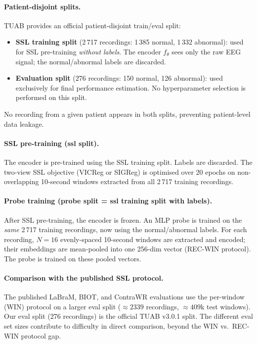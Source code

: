 \documentclass[11pt,a4paper]{article}
\begin{document}
\paragraph{Patient-disjoint splits.}
TUAB provides an official patient-disjoint train/eval split:
\begin{itemize}[noitemsep]
  \item \textbf{SSL training split} (2\,717 recordings: 1\,385 normal, 1\,332 abnormal):
    used for SSL pre-training \emph{without labels}.  The encoder $f_\theta$ sees only
    the raw EEG signal; the normal/abnormal labels are discarded.
  \item \textbf{Evaluation split} (276 recordings: 150 normal, 126 abnormal):
    used exclusively for final performance estimation.  No hyperparameter selection is
    performed on this split.
\end{itemize}
No recording from a given patient appears in both splits, preventing
patient-level data leakage.

\paragraph{SSL pre-training (ssl split).}
The encoder is pre-trained using the SSL training split.  Labels are discarded.
The two-view SSL objective (VICReg or SIGReg) is optimised over 20 epochs on
non-overlapping 10-second windows extracted from all 2\,717 training recordings.

\paragraph{Probe training (probe split = ssl training split with labels).}
After SSL pre-training, the encoder is frozen.  An MLP probe is trained on the
\emph{same} 2\,717 training recordings, now using the normal/abnormal labels.
For each recording, $N{=}16$ evenly-spaced 10-second windows are extracted and
encoded; their embeddings are mean-pooled into one 256-dim vector (REC-WIN protocol).
The probe is trained on these pooled vectors.

\paragraph{Comparison with the published SSL protocol.}
The published LaBraM, BIOT, and ContraWR evaluations use the per-window (WIN)
protocol on a larger eval split (${\approx}2339$ recordings, ${\approx}409$k test
windows).  Our eval split (276 recordings) is the official TUAB v3.0.1 split.
The different eval set sizes contribute to difficulty in direct comparison, beyond
the WIN vs.\ REC-WIN protocol gap.
\end{document}
